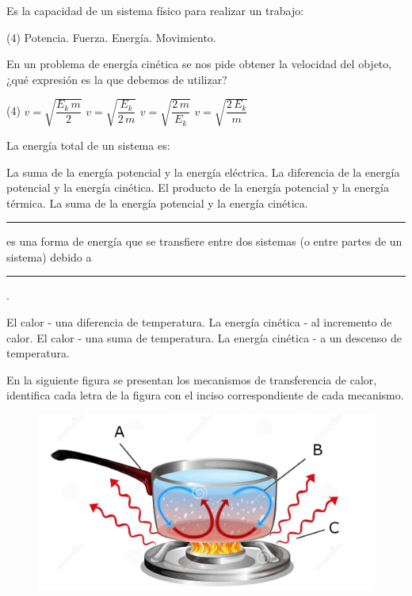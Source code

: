 \documentclass[12pt, letter]{exam}
\begin{document}
\begin{questions}
    \question Es la capacidad de un sistema físico para realizar un trabajo:
    \begin{tasks}(4)
        \task Potencia.
        \task Fuerza.
        \task Energía.
        \task Movimiento.
    \end{tasks}
    \question En un problema de energía cinética se nos pide obtener la velocidad del objeto, ¿qué expresión es la que debemos de utilizar?
    \begin{tasks}(4)
        \task $v = \sqrt{\dfrac{E_{k} \, m}{2}}$
        \task $v = \sqrt{\dfrac{E_{k}}{2 \, m}}$
        \task $v = \sqrt{\dfrac{2 \, m}{E_{k}}}$
        \task $v = \sqrt{\dfrac{2 \, E_{k}}{m}}$
    \end{tasks}
    \question La energía total de un sistema es:
    \begin{tasks}
        \task La suma de la energía potencial y la energía eléctrica.
        \task La diferencia de la energía potencial y la energía cinética.
        \task El producto de la energía potencial y la energía térmica.
        \task La suma de la energía potencial y la energía cinética.
    \end{tasks}
    \question \rule{2cm}{0.1mm} es una forma de energía que se transfiere entre dos sistemas (o entre partes de un sistema) debido a \rule{2cm}{0.1mm}.
    \begin{tasks}
        \task El calor - una diferencia de temperatura.
        \task La energía cinética - al incremento de calor.
        \task El calor - una suma de temperatura.
        \task La energía cinética - a un descenso de temperatura.
    \end{tasks}
    \question En la siguiente figura se presentan los mecanismos de transferencia de calor, identifica cada letra de la figura con el inciso correspondiente de cada mecanismo.
    \begin{figure}[H]
        \centering
        \includegraphics[scale=0.2]{Transferencia_Calor_01.jpg}

\end{figure}
\end{questions}
\end{document}
